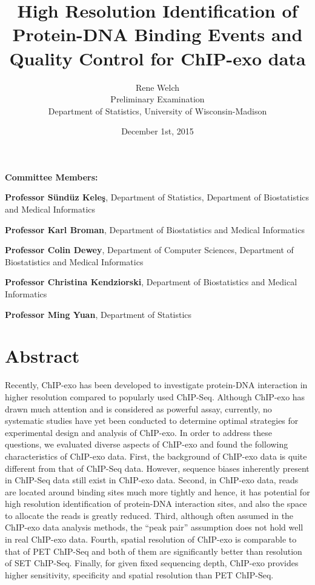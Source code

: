 \documentclass[11pt]{article}\usepackage[]{graphicx}\usepackage[]{color}
\title{High Resolution Identification of Protein-DNA Binding Events
  and Quality Control for ChIP-exo data\vspace*{\fill}}
\author{Rene Welch\\Preliminary Examination\\Department of Statistics, University of Wisconsin-Madison}
\date{December 1st, 2015}
\begin{document}
\maketitle

\vspace*{\fill}

\textbf{Committee Members:}

\textbf{Professor S\"und\"uz Kele\c{s}}, Department of Statistics,
Department of Biostatistics and Medical Informatics

\textbf{Professor Karl Broman}, Department of Biostatistics and
Medical Informatics

\textbf{Professor Colin Dewey}, Department of Computer Sciences,
Department of Biostatistics and Medical Informatics

\textbf{Professor Christina Kendziorski}, Department of Biostatistics
and Medical Informatics

\textbf{Professor Ming Yuan}, Department of Statistics

\thispagestyle{empty}


\newpage

\tableofcontents

\newpage

\section*{Abstract}

    Recently, ChIP-exo has been developed to investigate protein-DNA
    interaction in higher resolution compared to popularly used
    ChIP-Seq. Although ChIP-exo has drawn much attention and is
    considered as powerful assay, currently, no systematic studies
    have yet been conducted to determine optimal strategies for
    experimental design and analysis of ChIP-exo. In order to address
    these questions, we evaluated diverse aspects of ChIP-exo and
    found the following characteristics of ChIP-exo data. First, the
    background of ChIP-exo data is quite different from that of
    ChIP-Seq data. However, sequence biases inherently present in
    ChIP-Seq data still exist in ChIP-exo data. Second, in ChIP-exo
    data, reads are located around binding sites much more tightly and
    hence, it has potential for high resolution identification of
    protein-DNA interaction sites, and also the space to allocate the
    reads is greatly reduced. Third, although often assumed in the
    ChIP-exo data analysis methods, the ``peak pair'' assumption does
    not hold well in real ChIP-exo data. Fourth, spatial resolution of
    ChIP-exo is comparable to that of PET ChIP-Seq and both of them
    are significantly better than resolution of SET ChIP-Seq. Finally,
    for given fixed sequencing depth, ChIP-exo provides higher
    sensitivity, specificity and spatial resolution than PET
    ChIP-Seq.
\end{document}
